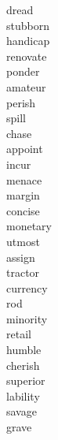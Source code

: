 \documentclass[a4paper, 10pt]{ctexart}
\begin{document}
\begin{multicols*}{2}
\begin{description}
\item[dread]

\item[stubborn]

\item[handicap]

\item[renovate]

\item[ponder]

\item[amateur]

\item[perish]

\item[spill]

\item[chase]

\item[appoint]

\item[incur]

\item[menace]

\item[margin]

\item[concise]

\item[monetary]

\item[utmost]

\item[assign]

\item[tractor]

\item[currency]

\item[rod]

\item[minority]

\item[retail]

\item[humble]

\item[cherish]

\item[superior]

\item[lability]

\item[savage]

\item[grave]


\end{description}
\end{multicols*}
\end{document}
